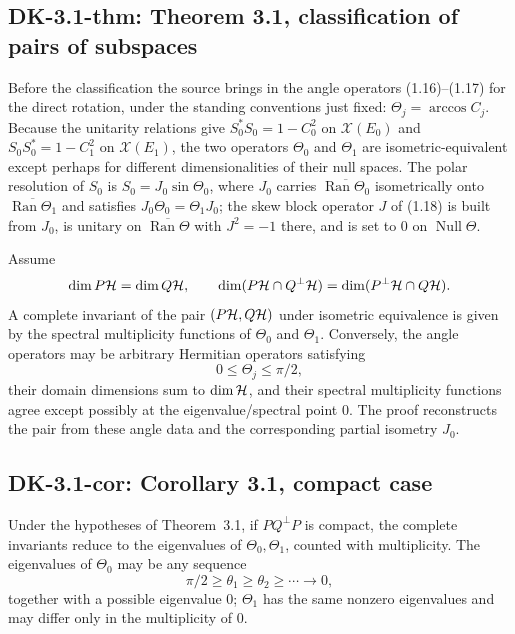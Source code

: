 \subsection*{DK-3.1-thm: Theorem 3.1, classification of pairs of subspaces}
Before the classification the source brings in the angle operators (1.16)--(1.17) for the direct rotation, under the standing conventions just fixed: $\Theta_j=\arccos C_j$.  Because the unitarity relations give $S_0^*S_0=1-C_0^2$ on $\mathcal X(E_0)$ and $S_0S_0^*=1-C_1^2$ on $\mathcal X(E_1)$, the two operators $\Theta_0$ and $\Theta_1$ are isometric-equivalent except perhaps for different dimensionalities of their null spaces.  The polar resolution of $S_0$ is $S_0=J_0\sin\Theta_0$, where $J_0$ carries $\overline{\operatorname{Ran}\Theta_0}$ isometrically onto $\overline{\operatorname{Ran}\Theta_1}$ and satisfies $J_0\Theta_0=\Theta_1J_0$; the skew block operator $J$ of (1.18) is built from $J_0$, is unitary on $\overline{\operatorname{Ran}\Theta}$ with $J^2=-1$ there, and is set to $0$ on $\operatorname{Null}\Theta$.

Assume
\[
 \dim P\mathcal{H}=\dim Q\mathcal{H},
 \qquad
 \dim(P\mathcal{H}\cap Q^\perp\mathcal{H})=\dim(P^\perp\mathcal{H}\cap Q\mathcal{H}).
\]
A complete invariant of the pair $(P\mathcal{H},Q\mathcal{H})$ under isometric equivalence is given by the spectral multiplicity functions of $\Theta_0$ and $\Theta_1$.  Conversely, the angle operators may be arbitrary Hermitian operators satisfying
\[
 0\le\Theta_j\le\pi/2,
\]
their domain dimensions sum to $\dim\mathcal{H}$, and their spectral multiplicity functions agree except possibly at the eigenvalue/spectral point $0$.  The proof reconstructs the pair from these angle data and the corresponding partial isometry $J_0$.

\subsection*{DK-3.1-cor: Corollary 3.1, compact case}
Under the hypotheses of Theorem~3.1, if $PQ^\perp P$ is compact, the complete invariants reduce to the eigenvalues of $\Theta_0,\Theta_1$, counted with multiplicity.  The eigenvalues of $\Theta_0$ may be any sequence
\[
 \pi/2\ge\theta_1\ge\theta_2\ge\cdots\to0,
\]
together with a possible eigenvalue $0$; $\Theta_1$ has the same nonzero eigenvalues and may differ only in the multiplicity of $0$.

